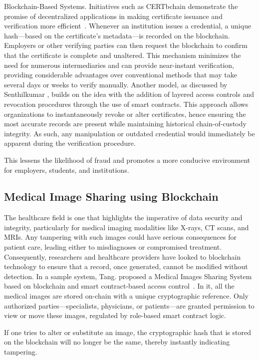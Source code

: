 Blockchain-Based Systems. Initiatives such as CERTbchain demonstrate the promise of decentralized
applications in making certificate issuance and verification more efficient~\cite{malsa2021}.
Whenever an institution issues a credential, a unique hash---based on the certificate's metadata---is
recorded on the blockchain. Employers or other verifying parties can then request the blockchain
to confirm that the certificate is complete and unaltered. This mechanism minimizes the need for
numerous intermediaries and can provide near-instant verification, providing considerable advantages
over conventional methods that may take several days or weeks to verify manually. Another model,
as discussed by Senthilkumar \cite{senthilkumar2023}, builds on the idea with the
addition of layered access controls and revocation procedures through the use of smart contracts.
This approach allows organizations to instantaneously revoke or alter certificates, hence ensuring
the most accurate records are present while maintaining historical chain-of-custody integrity.
As such, any manipulation or outdated credential would immediately be apparent during the
verification procedure.

This lessens the likelihood of fraud and promotes a more conducive environment for employers,
students, and institutions.

\subsection{Medical Image Sharing using Blockchain}
The healthcare field is one that highlights the imperative of data security and integrity,
particularly for medical imaging modalities like X-rays, CT scans, and MRIs. Any tampering with
such images could have serious consequences for patient care, leading either to misdiagnoses or
compromised treatment. Consequently, researchers and healthcare providers have looked to blockchain
technology to ensure that a record, once generated, cannot be modified without detection. In a sample
system, Tang. proposed a Medical Images Sharing System based on blockchain and smart
contract-based access control~\cite{tang2018}. In it, all the medical images are stored on-chain with
a unique cryptographic reference. Only authorized parties---specialists, physicians, or patients---are
granted permission to view or move these images, regulated by role-based smart contract logic.

If one tries to alter or substitute an image, the cryptographic hash that is stored on the blockchain
will no longer be the same, thereby instantly indicating tampering.

